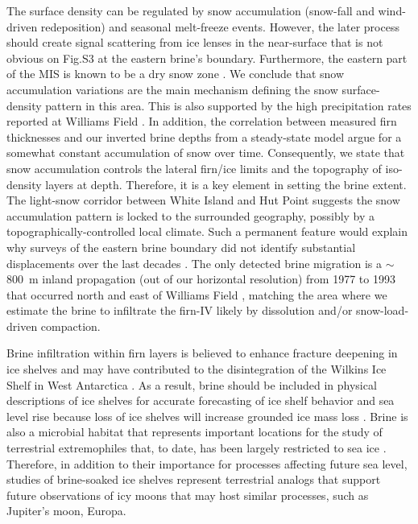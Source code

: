 \documentclass[draft,grl]{agutex}
\begin{document}
\begin{article}
The surface density can be regulated by snow accumulation (snow-fall and wind-driven redeposition) and seasonal melt-freeze events. However, the later process should create signal scattering from ice lenses in the near-surface that is not obvious on Fig.S3 at the eastern brine's boundary. Furthermore, the eastern part of the MIS is known to be a dry snow zone \citep{Glasser-2014-ID1003}. We conclude that snow accumulation variations are the main mechanism defining the snow surface-density pattern in this area. This is also supported by the high precipitation rates reported at Williams Field \citep{Mellor-1993-ID991}. In addition, the correlation between measured firn thicknesses \citep{Kovacs-1982-ID701} and our inverted brine depths from a steady-state model argue for a somewhat constant accumulation of snow over time. Consequently, we state that snow accumulation controls the lateral firn/ice limits and the topography of iso-density layers at depth. Therefore, it is a key element in setting the brine extent. The light-snow corridor between White Island and Hut Point suggests the snow accumulation pattern is locked to the surrounded geography, possibly by a topographically-controlled local climate. Such a permanent feature would explain why surveys of the eastern brine boundary did not identify substantial displacements over the last decades \citep{Clough-1973-ID703,Kovacs-1982-ID701, Morse-1994-ID696}. The only detected brine migration is a $\sim$800~m inland propagation (out of our horizontal resolution) from 1977 to 1993 that occurred north and east of Williams Field \citep{Morse-1994-ID696}, matching the area where we estimate the brine to infiltrate the firn-IV likely by dissolution and/or snow-load-driven compaction.

Brine infiltration within firn layers is believed to enhance fracture deepening in ice shelves and may have contributed to the disintegration of the Wilkins Ice Shelf in West Antarctica \citep{Scambos-2009-brine}. As a result, brine should be included in physical descriptions of ice shelves for accurate forecasting of ice shelf behavior and sea level rise because loss of ice shelves will increase grounded ice mass loss \citep{DeAngelis-2003-ID1060, Scambos-2004-ID1062}. Brine is also a microbial habitat that represents important locations for the study of terrestrial extremophiles that, to date, has been largely restricted to sea ice \citep{Thomas-2002-ID1059}. Therefore, in addition to their importance for processes affecting future sea level, studies of brine-soaked ice shelves represent terrestrial analogs that support future observations of icy moons that may host similar processes, such as Jupiter’s moon, Europa.


\end{article}
\end{document}
